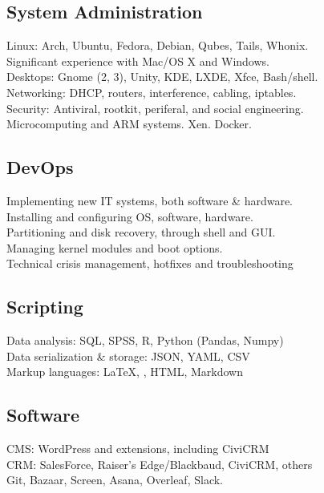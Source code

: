 \documentclass[]{deedy-resume-openfont}
\begin{document}
\begin{minipage}[t]{.5\textwidth}
    \subsection{System Administration}
		\textbullet{} Linux: Arch, Ubuntu, Fedora, Debian, Qubes, Tails, Whonix.\\
        \textbullet{} Significant experience with Mac/OS X and Windows. \\
   		\textbullet{} Desktops: Gnome (2, 3), Unity, KDE, LXDE, Xfce, Bash/shell. \\
    	\textbullet{} Networking: DHCP, routers, interference, cabling, iptables.\\
		\textbullet{} Security: Antiviral, rootkit, periferal, and social engineering.\\
        \textbullet{} Microcomputing and ARM systems. Xen. Docker.
    \sectionsep
	\subsection{DevOps}
   		\textbullet{} Implementing new IT systems, both software \& hardware.\\
       	\textbullet{} Installing and configuring OS, software, hardware. \\
        \textbullet{} Partitioning and disk recovery, through shell and GUI. \\
        \textbullet{} Managing kernel modules and boot options.\\
        \textbullet{} Technical crisis management, hotfixes and troubleshooting
    \sectionsep
   	\subsection{Scripting}
        \textbullet{} Data analysis: SQL, SPSS, R, Python (Pandas, Numpy) \\
        \textbullet{} Data serialization \& storage: JSON, YAML, CSV \\
        \textbullet{} Markup languages: \LaTeX, \XeLaTeX, HTML, Markdown 
    \sectionsep
    \subsection{Software}
        \textbullet{} CMS: WordPress and extensions, including CiviCRM \\
        \textbullet{} CRM: SalesForce, Raiser's Edge/Blackbaud, CiviCRM, others\\
        \textbullet{} Git, Bazaar, Screen, Asana, Overleaf, Slack.
\end{minipage}
\end{document}

